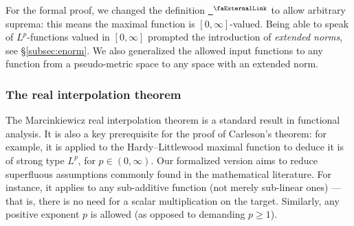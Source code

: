\documentclass[12pt]{amsart}
\newcommand{\extlink}{~\ensuremath{{}^\text{\faExternalLink}}}
\theoremstyle{definition}
\theoremstyle{plain}
\begin{document}
For the formal proof, we changed the definition
\href{https://github.com/fpvandoorn/carleson/blob/696c07687a9c26c87c8a1d36b16da3775d9d11e8/Carleson/ToMathlib/HardyLittlewood.lean#L32}{\extlink}
to allow arbitrary suprema: this means the maximal function is $[0,\infty]$-valued.
Being able to speak of $L^p$-functions valued in $[0,\infty]$ prompted the introduction of \emph{extended norms}, see \S\ref{subsec:enorm}.
We also generalized the allowed input functions to any function from a pseudo-metric space to any space with an extended norm.

\subsubsection{The real interpolation theorem}\label{subsubsec:real_interpolation}
The Marcinkiewicz real interpolation theorem is a standard result in functional analysis.
It is also a key prerequisite for the proof of Carleson's theorem: for example, it is applied to the Hardy–Littlewood maximal function to deduce it is of strong type $L^p$, for $p\in(0,\infty)$.
Our formalized version aims to reduce superfluous assumptions commonly found in the mathematical literature. For instance, it applies to any sub-additive function (not merely sub-linear ones) --- that is, there is no need for a scalar multiplication on the target. Similarly, any positive exponent $p$ is allowed (as opposed to demanding $p\geq 1$).
\end{document}
